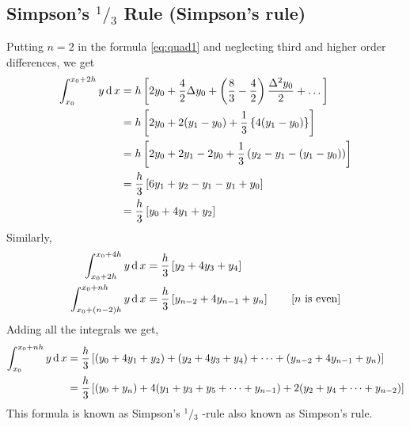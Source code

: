 \documentclass[12pt,class=book,crop=false]{standalone}
\begin{document}
\subsection{Simpson's $ {}^1/{}_3 $ Rule (Simpson's rule)}
Putting $ n=2 $ in the formula \eqref{eq:quad1} and neglecting third and higher order differences, we get
\begin{align*}
    \int_{x_0}^{x_0+2h} y \,\mathrm{d}\, x & =h\left[ 2y_0+\frac{4}{2}\Delta y_0+\left( \frac{8}{3}-\frac{4}{2} \right)\frac{\Delta^2 y_0}{2}+\dots \right] \\
                              & =h\left[ 2y_0+2(y_1-y_0)+\frac{1}{3}\left\{ 4(y_1-y_0) \right\}\right]                                         \\
                              & =h\left[ 2y_0+2y_1-2y_0+\frac{1}{3}\left( y_2-y_1-(y_1-y_0) \right)\right]                                     \\
                              & =\frac{h}{3}\left[ 6y_1+y_2-y_1-y_1+y_0\right]                                                                 \\
                              & =\frac{h}{3}\left[ y_0+4y_1+y_2\right]
\end{align*}
Similarly,
\begin{align*}
    \int_{x_0+2h}^{x_0+4h} y \,\mathrm{d}\, x     & =\frac{h}{3}\left[ y_2+4y_3+y_4\right]                                       \\
    \int_{x_0+(n-2)h}^{x_0+nh} y \,\mathrm{d}\, x & =\frac{h}{3}\left[ y_{n-2}+4y_{n-1}+y_n\right]\qquad  \text{[$ n $ is even]}
\end{align*}
Adding all the integrals we get,
\begin{align*}
    \int_{x_0}^{x_0+nh} y \,\mathrm{d}\, x & =\frac{h}{3}\left[ (y_0+4y_1+y_2)+(y_2+4y_3+y_4)+\dots+(y_{n-2}+4y_{n-1}+y_n)\right]      \\
                              & =\frac{h}{3}\left[ (y_0+y_n)+4(y_1+y_3+y_5+\dots+y_{n-1})+2(y_2+y_4+\dots+y_{n-2})\right]
\end{align*}
This formula is known as Simpson's $ {}^1/{}_{3} $ -rule also known as Simpson's rule.
\end{document}
